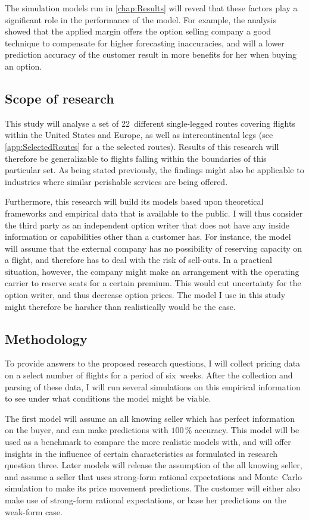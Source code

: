 The simulation models run in \autoref{chap:Results} will reveal that these factors play a significant role in the performance of the model. For example, the analysis showed that the applied margin offers the option selling company a good technique to compensate for higher forecasting inaccuracies, and will a lower prediction accuracy of the customer result in more benefits for her when buying an option.


\subsection{Scope of research}
This study will analyse a set of 22~different single-legged routes covering flights within the United States and Europe, as well as intercontinental legs (see \autoref{app:SelectedRoutes} for a the selected routes). Results of this research will therefore be generalizable to flights falling within the boundaries of this particular set. As being stated previously, the findings might also be applicable to industries where similar perishable services are being offered.

Furthermore, this research will build its models based upon theoretical frameworks and empirical data that is available to the public. I will thus consider the third party as an independent option writer that does not have any inside information or capabilities other than a customer has. For instance, the model will assume that the external company has no possibility of reserving capacity on a flight, and therefore has to deal with the risk of sell-outs. In a practical situation, however, the company might make an arrangement with the operating carrier to reserve seats for a certain premium. This would cut uncertainty for the option writer, and thus decrease option prices. The model I use in this study might therefore be harsher than realistically would be the case.


\subsection{Methodology}
To provide answers to the proposed research questions, I will collect pricing data on a select number of flights for a period of six~weeks. After the collection and parsing of these data, I will run several simulations on this empirical information to see under what conditions the model might be viable.

The first model will assume an all knowing seller which has perfect information on the buyer, and can make predictions with $100\,\%$ accuracy. This model will be used as a benchmark to compare the more realistic models with, and will offer insights in the influence of certain characteristics as formulated in research question three. Later models will release the assumption of the all knowing seller, and assume a seller that uses strong-form rational expectations and Monte~Carlo simulation to make its price movement predictions. The customer will either also make use of strong-form rational expectations, or base her predictions on the weak-form case.


